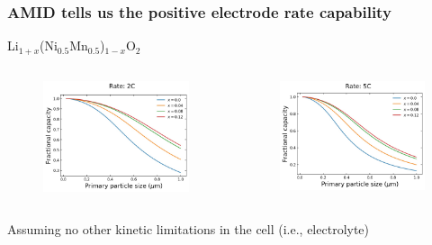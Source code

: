 \documentclass{beamer}
\begin{document}
\begin{frame}
\frametitle{AMID tells us the positive electrode rate capability}

\centering
Li$_{1+x}$(Ni$_{0.5}$Mn$_{0.5}$)$_{1-x}$O$_2$
\vspace{-0.5cm}
\begin{columns}
	
	\begin{figure}
		\includegraphics[width=0.95\linewidth]{figs/cap-primsize_2C.jpg}
	\end{figure}
	
	\begin{figure}
		\includegraphics[width=0.95\linewidth]{figs/cap-primsize_5C.jpg}
	\end{figure}
	
\end{columns}

Assuming no other kinetic limitations in the cell (i.e., electrolyte)

\end{frame}
\end{document}
